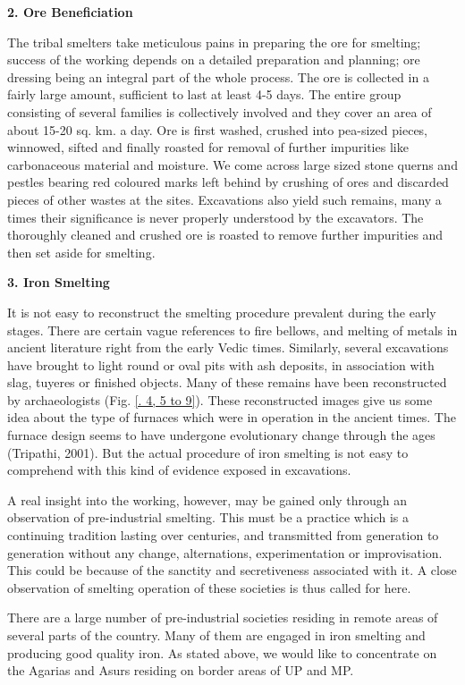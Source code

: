 \noindent \textbf{\large 2. Ore Beneficiation}

The tribal smelters take meticulous pains in preparing the ore for smelting; success of the working depends on a detailed preparation and planning; ore dressing being an integral part of the whole process. The ore is collected in a fairly large amount, sufficient to last at least 4-5 days. The entire group consisting of several families is collectively involved and they cover an area of about 15-20 sq. km. a day. Ore is first washed, crushed into pea-sized pieces, winnowed, sifted and finally roasted for removal of further impurities like carbonaceous material and moisture. We come across large sized stone querns and pestles bearing red coloured marks left behind by crushing of ores and discarded pieces of other wastes at the sites. Excavations also yield such remains, many a times their significance is never properly understood by the excavators. The thoroughly cleaned and crushed ore is roasted to remove further impurities and then set aside for smelting.

\noindent \textbf{\large 3. Iron Smelting}

It is not easy to reconstruct the smelting procedure prevalent during the early stages. There are certain vague references to fire bellows, and melting of metals in ancient literature right from the early Vedic times. Similarly, several excavations have brought to light round or oval pits with ash deposits, in association with slag, tuyeres or finished objects. Many of these remains have been reconstructed by archaeologists (Fig. \ref{. 4, 5 to 9}). These reconstructed images give us some idea about the type of furnaces which were in operation in the ancient times. The furnace design seems to have undergone evolutionary change through the ages (Tripathi, 2001). But the actual procedure of iron smelting is not easy to comprehend with this kind of evidence exposed in excavations.

A real insight into the working, however, may be gained only through an observation of pre-industrial smelting. This must be a practice which is a continuing tradition lasting over centuries, and transmitted from generation to generation without any change, alternations, experimentation or improvisation. This could be because of the sanctity and secretiveness associated with it. A close observation of smelting operation of these societies is thus called for here.

There are a large number of pre-industrial societies residing in remote areas of several parts of the country. Many of them are engaged in iron smelting and producing good quality iron. As stated above, we would like to concentrate on the Agarias and Asurs residing on border areas of UP and MP. 


